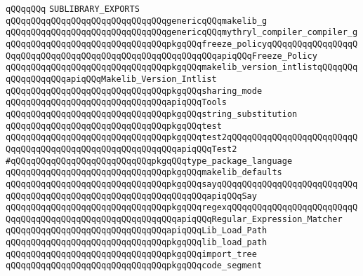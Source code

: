 \newline
\verb|qQQqqQQq|\newline
\newline
\verb|SUBLIBRARY_EXPORTS|\newline
\newline
\verb|qQQqqQQqqQQqqQQqqQQqqQQqqQQqqQQqgenericqQQqmakelib_g|\newline
\verb|qQQqqQQqqQQqqQQqqQQqqQQqqQQqqQQqgenericqQQqmythryl_compiler_compiler_g|\newline
\newline
\verb|qQQqqQQqqQQqqQQqqQQqqQQqqQQqqQQqpkgqQQqfreeze_policyqQQqqQQqqQQqqQQqqQQqqQQqqQQqqQQqqQQqqQQqqQQqqQQqqQQqqQQqqQQqapiqQQqFreeze_Policy|\newline
\verb|qQQqqQQqqQQqqQQqqQQqqQQqqQQqqQQqpkgqQQqmakelib_version_intlistqQQqqQQqqQQqqQQqqQQqapiqQQqMakelib_Version_Intlist|\newline
\verb|qQQqqQQqqQQqqQQqqQQqqQQqqQQqqQQqpkgqQQqsharing_mode|\newline
\verb|qQQqqQQqqQQqqQQqqQQqqQQqqQQqqQQqapiqQQqTools|\newline
\verb|qQQqqQQqqQQqqQQqqQQqqQQqqQQqqQQqpkgqQQqstring_substitution|\newline
\verb|qQQqqQQqqQQqqQQqqQQqqQQqqQQqqQQqpkgqQQqtest|\newline
\verb|qQQqqQQqqQQqqQQqqQQqqQQqqQQqqQQqpkgqQQqtest2qQQqqQQqqQQqqQQqqQQqqQQqqQQqqQQqqQQqqQQqqQQqqQQqqQQqqQQqqQQqapiqQQqTest2|\newline
\newline
\verb|#qQQqqQQqqQQqqQQqqQQqqQQqqQQqpkgqQQqtype_package_language|\newline
\verb|qQQqqQQqqQQqqQQqqQQqqQQqqQQqqQQqpkgqQQqmakelib_defaults|\newline
\verb|qQQqqQQqqQQqqQQqqQQqqQQqqQQqqQQqpkgqQQqsayqQQqqQQqqQQqqQQqqQQqqQQqqQQqqQQqqQQqqQQqqQQqqQQqqQQqqQQqqQQqqQQqqQQqapiqQQqSay|\newline
\verb|qQQqqQQqqQQqqQQqqQQqqQQqqQQqqQQqpkgqQQqregexqQQqqQQqqQQqqQQqqQQqqQQqqQQqqQQqqQQqqQQqqQQqqQQqqQQqqQQqqQQqapiqQQqRegular_Expression_Matcher|\newline
\newline
\verb|qQQqqQQqqQQqqQQqqQQqqQQqqQQqqQQqapiqQQqLib_Load_Path|\newline
\verb|qQQqqQQqqQQqqQQqqQQqqQQqqQQqqQQqpkgqQQqlib_load_path|\newline
\newline
\verb|qQQqqQQqqQQqqQQqqQQqqQQqqQQqqQQqpkgqQQqimport_tree|\newline
\verb|qQQqqQQqqQQqqQQqqQQqqQQqqQQqqQQqpkgqQQqcode_segment|\newline
